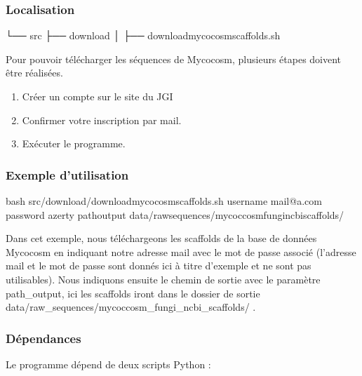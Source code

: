 \documentclass[letterpaper,10pt,french]{sphinxmanual}
\begin{document}
\subsubsection{Localisation}
\label{\detokenize{tutorial:id7}}
\begin{sphinxVerbatim}[commandchars=\\\{\}]
└── src
 ├── download
 │   ├── download\PYGZus{}mycocosm\PYGZus{}scaffolds.sh
\end{sphinxVerbatim}

Pour pouvoir télécharger les séquences de Mycocosm, plusieurs étapes doivent être réalisées.
\begin{enumerate}
%
\item {} 
Créer un compte sur le site du JGI  

\item {} 
Confirmer votre inscription par mail.

\item {} 
Exécuter le programme.

\end{enumerate}


\subsubsection{Exemple d’utilisation}
\label{\detokenize{tutorial:id8}}
\begin{sphinxVerbatim}[commandchars=\\\{\}]
bash src/download/download\PYGZus{}mycocosm\PYGZus{}scaffolds.sh 
                  \PYGZhy{}username mail@a.com
                  \PYGZhy{}password azerty 
                  \PYGZhy{}path\PYGZus{}output data/raw\PYGZus{}sequences/mycoccosm\PYGZus{}fungi\PYGZus{}ncbi\PYGZus{}scaffolds/
\end{sphinxVerbatim}

Dans cet exemple, nous téléchargeons les scaffolds de la base de données Mycocosm en indiquant notre adresse mail avec le mot de passe associé (l’adresse mail et le mot de passe sont donnés ici à titre d’exemple et ne sont pas utilisables). Nous indiquons ensuite le chemin de sortie avec le paramètre \sphinxhyphen{}path\_output, ici les scaffolds iront dans le dossier de sortie data/raw\_sequences/mycoccosm\_fungi\_ncbi\_scaffolds/ .


\subsubsection{Dépendances}
\label{\detokenize{tutorial:dependances}}
Le programme dépend de deux scripts Python :
\end{document}
